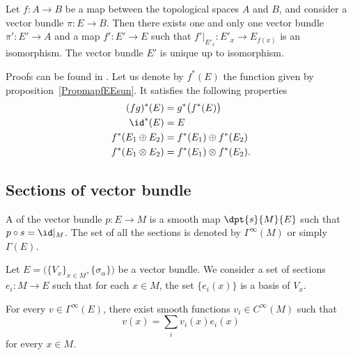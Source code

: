 \begin{proposition}		\label{PropmapfEEsun}
	Let $f\colon A\to B$ be a map between the topological spaces $A$ and $B$, and consider a vector bundle $\pi\colon E\to B$. Then there exists one and only one vector bundle $\pi'\colon E'\to A$ and a map $f'\colon E'\to E$ such that $f'|_{E'_x}\colon E'_x\to E_{f(x)}$ is an isomorphism. The vector bundle $E'$ is unique up to isomorphism.
\end{proposition}
Proofs can be found in \cite{VB_and_K}. Let us denote by $f^*(E)$ the function given by proposition~\ref{PropmapfEEsun}. It satisfies the following properties
\begin{equation}		\label{EqPropfstarEVect}
	\begin{split}
		(fg)^*(E)		&=g^*\big( f^*(E) \big)\\
		\id^*(E)		&=E\\
		f^*(E_1\oplus E_2)	&=f^*(E_1)\oplus f^*(E_2)\\
		f^*(E_1\otimes E_2)	&=f^*(E_1)\otimes f^*(E_2).
	\end{split}
\end{equation}



\subsection{Sections of vector bundle}

\begin{definition}		\label{DEFooULPGooZeVheH}
	A  of the vector bundle $p\colon E\to M$ is a smooth map $\dpt{s}{M}{E}$ such that $p\circ s=\id|_M$. The set of all the sections is denoted by $\Gamma^{\infty}(M)$ or simply $\Gamma(E)$.
\end{definition}

\begin{proposition}		\label{PROPooMCJWooNAqmIQ}
	Let \( E= \big(  \{ V_x \}_{x\in M},  \{ \sigma_{\alpha} \}  \big)\) be a vector bundle. We consider a set of sections \(e_i \colon M\to E  \) such that for each \( x\in M\), the set \( \{ e_i(x) \}\) is a basis of \( V_x\).

	For every \( v\in \Gamma^{\infty}(E)\), there exist smooth functions \( v_i\in C^{\infty}(M)\) such that
	\begin{equation}
		v(x)=\sum_iv_i(x)e_i(x)
	\end{equation}
	for every \( x\in M\).
\end{proposition}

